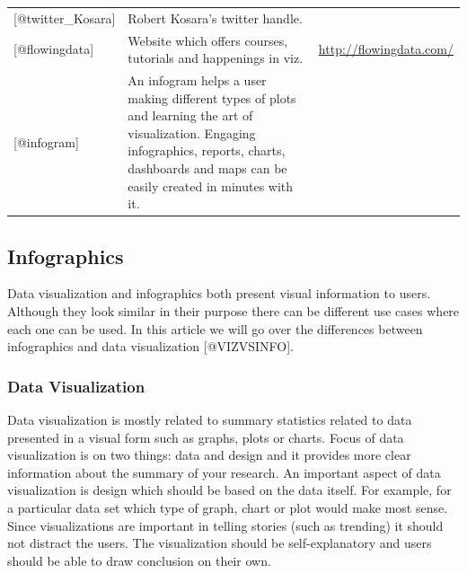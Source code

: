 \documentclass[]{book}
\theoremstyle{definition}
\theoremstyle{definition}
\theoremstyle{definition}
\theoremstyle{remark}
\begin{document}
\begin{longtable}[]{@{}lll@{}}
\begin{minipage}[t]{0.15\columnwidth}
{[}@twitter\_Kosara{]}\strut
\end{minipage} & \begin{minipage}[t]{0.28\columnwidth}\raggedright\strut
Robert Kosara's twitter handle.\strut
\end{minipage}\tabularnewline
\begin{minipage}[t]{0.15\columnwidth}\raggedright\strut
{[}@flowingdata{]}\strut
\end{minipage} & \begin{minipage}[t]{0.28\columnwidth}\raggedright\strut
Website which offers courses, tutorials and happenings in viz.\strut
\end{minipage} & \begin{minipage}[t]{0.48\columnwidth}\raggedright\strut
\url{http://flowingdata.com/}\strut
\end{minipage}\tabularnewline
\begin{minipage}[t]{0.15\columnwidth}\raggedright\strut
{[}@infogram{]}\strut
\end{minipage} & \begin{minipage}[t]{0.28\columnwidth}\raggedright\strut
An infogram helps a user making different types of plots and learning
the art of visualization. Engaging infographics, reports, charts,
dashboards and maps can be easily created in minutes with it.\strut
\end{minipage}\tabularnewline
\bottomrule
\end{longtable}

\subsection{Infographics}\label{infographics}

Data visualization and infographics both present visual information to
users. Although they look similar in their purpose there can be
different use cases where each one can be used. In this article we will
go over the differences between infographics and data visualization
{[}@VIZVSINFO{]}.

\subsubsection{Data Visualization}\label{data-visualization}

Data visualization is mostly related to summary statistics related to
data presented in a visual form such as graphs, plots or charts. Focus
of data visualization is on two things: data and design and it provides
more clear information about the summary of your research. An important
aspect of data visualization is design which should be based on the data
itself. For example, for a particular data set which type of graph,
chart or plot would make most sense. Since visualizations are important
in telling stories (such as trending) it should not distract the users.
The visualization should be self-explanatory and users should be able to
draw conclusion on their own.
\end{document}
